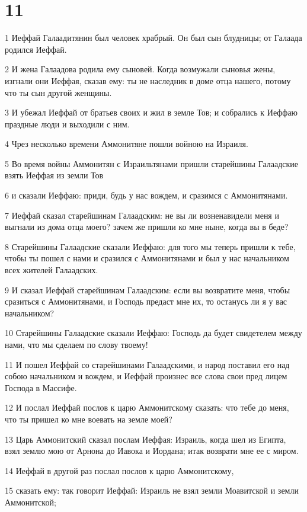 \chapter{11}

\par 1 Иеффай Галаадитянин был человек храбрый. Он был сын блудницы; от Галаада родился Иеффай.
\par 2 И жена Галаадова родила ему сыновей. Когда возмужали сыновья жены, изгнали они Иеффая, сказав ему: ты не наследник в доме отца нашего, потому что ты сын другой женщины.
\par 3 И убежал Иеффай от братьев своих и жил в земле Тов; и собрались к Иеффаю праздные люди и выходили с ним.
\par 4 Чрез несколько времени Аммонитяне пошли войною на Израиля.
\par 5 Во время войны Аммонитян с Израильтянами пришли старейшины Галаадские взять Иеффая из земли Тов
\par 6 и сказали Иеффаю: приди, будь у нас вождем, и сразимся с Аммонитянами.
\par 7 Иеффай сказал старейшинам Галаадским: не вы ли возненавидели меня и выгнали из дома отца моего? зачем же пришли ко мне ныне, когда вы в беде?
\par 8 Старейшины Галаадские сказали Иеффаю: для того мы теперь пришли к тебе, чтобы ты пошел с нами и сразился с Аммонитянами и был у нас начальником всех жителей Галаадских.
\par 9 И сказал Иеффай старейшинам Галаадским: если вы возвратите меня, чтобы сразиться с Аммонитянами, и Господь предаст мне их, то останусь ли я у вас начальником?
\par 10 Старейшины Галаадские сказали Иеффаю: Господь да будет свидетелем между нами, что мы сделаем по слову твоему!
\par 11 И пошел Иеффай со старейшинами Галаадскими, и народ поставил его над собою начальником и вождем, и Иеффай произнес все слова свои пред лицем Господа в Массифе.
\par 12 И послал Иеффай послов к царю Аммонитскому сказать: что тебе до меня, что ты пришел ко мне воевать на земле моей?
\par 13 Царь Аммонитский сказал послам Иеффая: Израиль, когда шел из Египта, взял землю мою от Арнона до Иавока и Иордана; итак возврати мне ее с миром.
\par 14 Иеффай в другой раз послал послов к царю Аммонитскому,
\par 15 сказать ему: так говорит Иеффай: Израиль не взял земли Моавитской и земли Аммонитской;
